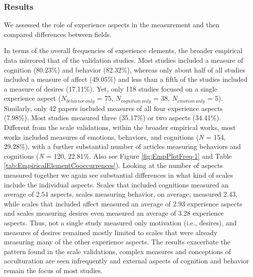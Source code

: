 \subsubsection{Results}

We assessed the role of experience aspects in the measurement and then
compared differences between fields.

In terms of the overall frequencies of experience elements, the broader
empirical data mirrored that of the validation studies. Most studies
included a measure of cognition (80.23\%) and behavior (82.32\%),
whereas only about half of all studies included a measure of affect
(49.05\%) and less than a fifth of the studies included a measure of
desires (17.11\%). Yet, only 118 studies focused on a single experience
aspect (\(N_{behavior\ only}\) = 75, \(N_{cognition\ only}\) = 38,
\(N_{emotion\ only}\) = 5). Similarly, only 42 papers included measures
of all four experience aspects (7.98\%). Most studies measured three
(35.17\%) or two aspects (34.41\%). Different from the scale
validations, within the broader empirical works, most works included
measures of emotions, behaviors, and cognitions (\textit{N} = 154,
29.28\%), with a further substantial number of articles measuring
behaviors and cognitions (\textit{N} = 120, 22.81\%. Also see Figure
\ref{fig:EmpPlotFreq-1} and Table
\ref{tab:EmpiricalElementCooccurrences}). Looking at the number of
aspects measured together we again see substantial differences in what
kind of scales include the individual aspects. Scales that included
cognitions measured an average of 2.54 aspects, scales measuring
behavior, on average, measured 2.43, while scales that included affect
measured an average of 2.93 experience aspects and scales measuring
desires even measured an average of 3.28 experience aspects. Thus, not a
single study measured only motivation (i.e., desires), and measures of
desires remained mostly limited to scales that were already measuring
many of the other experience aspects. The results exacerbate the pattern
found in the scale validations, complex measures and conceptions of
acculturation are seen infrequently and external aspects of cognition
and behavior remain the focus of most studies.

